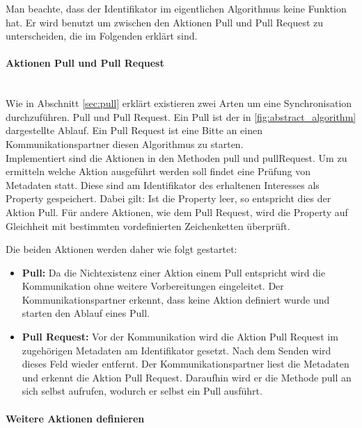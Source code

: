 \documentclass[a4paper]{article}
\begin{document}
	Man beachte, dass der Identifikator im eigentlichen Algorithmus
	keine Funktion hat. Er wird	benutzt um zwischen den Aktionen Pull und Pull
	Request zu unterscheiden, die im Folgenden erklärt sind.	

	\paragraph{Aktionen Pull und Pull Request}\mbox{} \\
	
	Wie in Abschnitt \ref{sec:pull} erklärt existieren zwei Arten um eine
	Synchronisation durchzuführen. Pull und Pull Request. Ein Pull ist der in
	\autoref{fig:abstract_algorithm} dargestellte Ablauf. Ein Pull Request ist
	eine Bitte an einen Kommunikationspartner diesen Algorithmus zu starten. \\
	
	Implementiert sind die Aktionen in den Methoden pull und pullRequest. Um
	zu ermitteln welche Aktion ausgeführt werden soll findet eine Prüfung von
	Metadaten statt. Diese sind am Identifikator des erhaltenen Interesses
	als Property gespeichert. Dabei gilt: Ist die Property leer, so entspricht
	dies der Aktion Pull. Für andere Aktionen, wie dem Pull Request, wird die
	Property auf Gleichheit mit bestimmten vordefinierten Zeichenketten überprüft.
	
	Die beiden Aktionen werden daher wie folgt gestartet:
	
	\begin{itemize}
		\item \textbf{Pull:} Da die Nichtexistenz einer Aktion einem Pull 
		entspricht wird die Kommunikation ohne weitere Vorbereitungen eingeleitet.
		Der Kommunikationspartner erkennt, dass keine Aktion definiert wurde und
		starten den Ablauf eines Pull.
		\item \textbf{Pull Request:} Vor der Kommunikation wird die Aktion
		Pull Request im zugehörigen Metadaten am Identifikator gesetzt. Nach dem
		Senden wird dieses Feld wieder entfernt. Der Kommunikationspartner 
		liest die Metadaten und erkennt die Aktion Pull Request. Daraufhin wird
		er die Methode pull an sich selbst aufrufen, wodurch er selbst ein
		Pull ausführt.
	\end{itemize} 
	
	\newpage
	\paragraph{Weitere Aktionen definieren}\mbox{} \\
	
\end{document}
